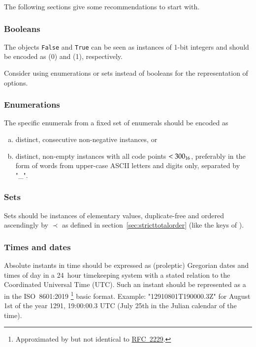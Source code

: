 The following sections give some recommendations to start with.


\subsubsection{Booleans}

The objects \texttt{False} and \texttt{True} can be seen as instances of 1-bit integers and should be encoded as
\DborIntegerValue(0) and \DborIntegerValue(1), respectively.

Consider using enumerations or sets instead of booleans for the representation of options.


\subsubsection{Enumerations}

The specific enumerals from a fixed set of enumerals should be encoded as
\begin{enumerate}[a)]
    \item
    distinct, consecutive non-negative \DborIntegerValue{} instances, or

    \item
    distinct, non-empty \DborUtfEightStringValue{} instances with all code points $< \mathrm{300}_{16}$,
    preferably in the form of words from upper-case ASCII letters and digits only, separated by "\_".
\end{enumerate}


\subsubsection{Sets}

Sets should be \DborSequenceValue{} instances of elementary values,
duplicate-free and ordered ascendingly by ${\prec}$ as defined in section~\ref{sec:stricttotalorder}
(like the keys of \DborDictionaryValue).


\subsubsection{Times and dates}

Absolute instants in time should be expressed as (proleptic) Gregorian dates and times of day in a
24~hour timekeeping system with a stated relation to the Coordinated Universal Time (UTC).
Such an instant should be represented as a \DborUtfEightStringValue{} in the ISO~8601:2019%
\footnote{%
    Approximated by but not identical to \href{https://tools.ietf.org/html/rfc3339}{RFC~2229}.
} basic format.
Example: "12910801T190000.3Z" for August 1st of the year 1291, 19:00:00.3 UTC
(July 25th in the Julian calendar of the time).
